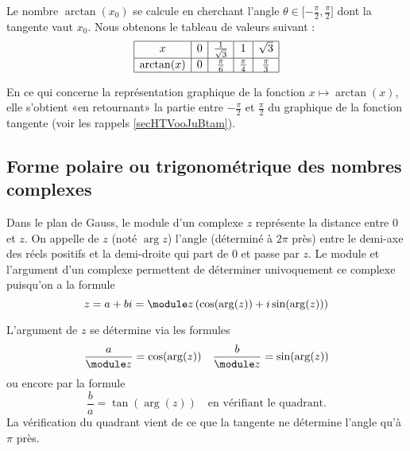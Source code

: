 Le nombre \( \arctan(x_0)\) se calcule en cherchant l'angle \( \theta\in\mathopen[ -\frac{ \pi }{2} , \frac{ \pi }{2} \mathclose]\) dont la tangente vaut \( x_0\). Nous obtenons le tableau de valeurs suivant :
\begin{equation*}
    \begin{array}[]{|c|c|c|c|c|}
        \hline
        x&0&\frac{1}{ \sqrt{3} }&1&\sqrt{3}\\
        \hline
        \arctan(x)&0&\frac{ \pi }{ 6 }&\frac{ \pi }{ 4 }&\frac{ \pi }{ 3 }\\
        \hline
    \end{array}
\end{equation*}

En ce qui concerne la représentation graphique de la fonction \( x\mapsto\arctan(x)\), elle s'obtient «en retournant» la partie entre \( -\frac{ \pi }{2}\) et \( \frac{ \pi }{ 2 }\) du graphique de la fonction tangente (voir les rappels \ref{secHTVooJuBtam}).
\begin{center}
   
\end{center}

\subsection{Forme polaire ou trigonométrique des nombres complexes}

Dans le plan de Gauss, le module d'un complexe $z$ représente la distance entre $0$ et $z$. On appelle  de $z$ (noté $\arg z$) l'angle (déterminé à $2\pi$ près) entre le demi-axe des réels positifs et la demi-droite qui part de $0$ et passe par $z$. Le module et l'argument d'un complexe permettent de déterminer univoquement ce complexe puisqu'on a la formule
\[z = a + bi = \module z \left( \cos(\arg(z)) + i \sin(\arg(z)) \right)\]

L'argument de $z$ se détermine via les formules 
\[\frac a {\module z} = \cos(\arg(z)) \quad \frac b {\module z} = \sin(\arg(z))\]
ou encore par la formule
\[
\frac b a = \tan(\arg(z)) \quad \text{en vérifiant le quadrant.}
\]
La vérification du quadrant vient de ce que la tangente ne détermine l'angle qu'à $\pi$ près.

